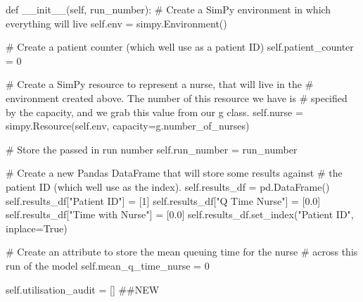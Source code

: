 \documentclass[
  letterpaper,
  DIV=11,
  numbers=noendperiod]{scrreprt}
\newenvironment{Shaded}{}{}
\newcommand{\CommentTok}[1]{\textcolor[rgb]{0.42,0.45,0.49}{#1}}
\newcommand{\DecValTok}[1]{\textcolor[rgb]{0.00,0.36,0.77}{#1}}
\newcommand{\FloatTok}[1]{\textcolor[rgb]{0.00,0.36,0.77}{#1}}
\newcommand{\FunctionTok}[1]{\textcolor[rgb]{0.44,0.26,0.76}{#1}}
\newcommand{\KeywordTok}[1]{\textcolor[rgb]{0.84,0.23,0.29}{#1}}
\newcommand{\NormalTok}[1]{\textcolor[rgb]{0.14,0.16,0.18}{#1}}
\newcommand{\OperatorTok}[1]{\textcolor[rgb]{0.14,0.16,0.18}{#1}}
\newcommand{\StringTok}[1]{\textcolor[rgb]{0.01,0.18,0.38}{#1}}
\newcommand{\VariableTok}[1]{\textcolor[rgb]{0.89,0.38,0.04}{#1}}
\begin{document}
\begin{Shaded}
\begin{Highlighting}[]
\KeywordTok{def} \FunctionTok{\_\_init\_\_}\NormalTok{(}\VariableTok{self}\NormalTok{, run\_number):}
    \CommentTok{\# Create a SimPy environment in which everything will live}
    \VariableTok{self}\NormalTok{.env }\OperatorTok{=}\NormalTok{ simpy.Environment()}

    \CommentTok{\# Create a patient counter (which we\textquotesingle{}ll use as a patient ID)}
    \VariableTok{self}\NormalTok{.patient\_counter }\OperatorTok{=} \DecValTok{0}

    \CommentTok{\# Create a SimPy resource to represent a nurse, that will live in the}
    \CommentTok{\# environment created above.  The number of this resource we have is}
    \CommentTok{\# specified by the capacity, and we grab this value from our g class.}
    \VariableTok{self}\NormalTok{.nurse }\OperatorTok{=}\NormalTok{ simpy.Resource(}\VariableTok{self}\NormalTok{.env, capacity}\OperatorTok{=}\NormalTok{g.number\_of\_nurses)}

    \CommentTok{\# Store the passed in run number}
    \VariableTok{self}\NormalTok{.run\_number }\OperatorTok{=}\NormalTok{ run\_number}

    \CommentTok{\# Create a new Pandas DataFrame that will store some results against}
    \CommentTok{\# the patient ID (which we\textquotesingle{}ll use as the index).}
    \VariableTok{self}\NormalTok{.results\_df }\OperatorTok{=}\NormalTok{ pd.DataFrame()}
    \VariableTok{self}\NormalTok{.results\_df[}\StringTok{"Patient ID"}\NormalTok{] }\OperatorTok{=}\NormalTok{ [}\DecValTok{1}\NormalTok{]}
    \VariableTok{self}\NormalTok{.results\_df[}\StringTok{"Q Time Nurse"}\NormalTok{] }\OperatorTok{=}\NormalTok{ [}\FloatTok{0.0}\NormalTok{]}
    \VariableTok{self}\NormalTok{.results\_df[}\StringTok{"Time with Nurse"}\NormalTok{] }\OperatorTok{=}\NormalTok{ [}\FloatTok{0.0}\NormalTok{]}
    \VariableTok{self}\NormalTok{.results\_df.set\_index(}\StringTok{"Patient ID"}\NormalTok{, inplace}\OperatorTok{=}\VariableTok{True}\NormalTok{)}

    \CommentTok{\# Create an attribute to store the mean queuing time for the nurse}
    \CommentTok{\# across this run of the model}
    \VariableTok{self}\NormalTok{.mean\_q\_time\_nurse }\OperatorTok{=} \DecValTok{0}

    \VariableTok{self}\NormalTok{.utilisation\_audit }\OperatorTok{=}\NormalTok{ [] }\CommentTok{\#\#NEW}
\end{Highlighting}
\end{Shaded}
\end{document}
